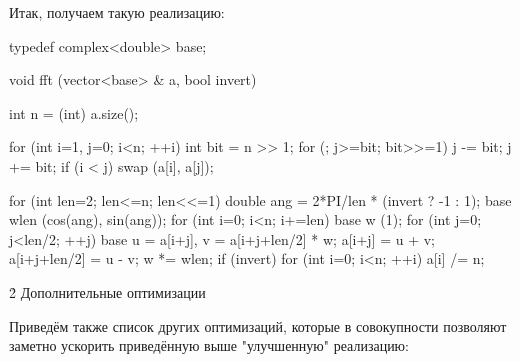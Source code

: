 Итак, получаем такую реализацию:

\code
typedef complex<double> base;

void fft (vector<base> & a, bool invert) {
	int n = (int) a.size();

	for (int i=1, j=0; i<n; ++i) {
		int bit = n >> 1;
		for (; j>=bit; bit>>=1)
			j -= bit;
		j += bit;
		if (i < j)
			swap (a[i], a[j]);
	}

	for (int len=2; len<=n; len<<=1) {
		double ang = 2*PI/len * (invert ? -1 : 1);
		base wlen (cos(ang), sin(ang));
		for (int i=0; i<n; i+=len) {
			base w (1);
			for (int j=0; j<len/2; ++j) {
				base u = a[i+j],  v = a[i+j+len/2] * w;
				a[i+j] = u + v;
				a[i+j+len/2] = u - v;
				w *= wlen;
			}
		}
	}
	if (invert)
		for (int i=0; i<n; ++i)
			a[i] /= n;
}
\endcode


\h2{ Дополнительные оптимизации }

Приведём также список других оптимизаций, которые в совокупности позволяют заметно ускорить приведённую выше "улучшенную" реализацию:

